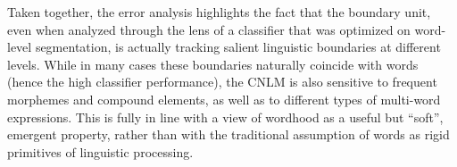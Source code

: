 Taken together, the error analysis highlights the fact that the
boundary unit, even when analyzed through the lens of a classifier
that was optimized on word-level segmentation, is actually tracking
salient linguistic boundaries at different levels. While in many cases
these boundaries naturally coincide with words (hence the high
classifier performance), the CNLM is also sensitive to frequent
morphemes and compound elements, as well as to different types of
multi-word expressions. This is fully in line with a view of wordhood
as a useful but ``soft'', emergent property, rather than with the
traditional assumption of words as rigid primitives of linguistic
processing.






